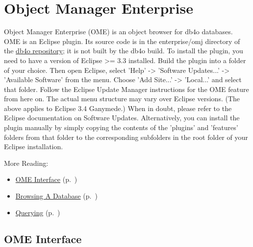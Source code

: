 
\chapter{Object Manager Enterprise}
\label{ref:object-manager-enterprise}

Object Manager Enterprise (OME) is an object browser for db4o databases. OME is an Eclipse plugin. Its source code is in the enterprise/omj directory of the \href{https://github.com/blakemcbride/db4o}{db4o repository}; it is not built by the db4o build. To install the plugin, you need to have a version of Eclipse \textgreater{}= 3.3 installed. Build the plugin into a folder of your choice. Then open Eclipse, select 'Help' -\textgreater{} 'Software Updates...' -\textgreater{} 'Available Software' from the menu. Choose 'Add Site...' -\textgreater{} 'Local...' and select that folder. Follow the Eclipse Update Manager instructions for the OME feature from here on. The actual menu structure may vary over Eclipse versions. (The above applies to Eclipse 3.4 Ganymede.) When in doubt, please refer to the Eclipse documentation on Software Updates. Alternatively, you can install the plugin manually by simply copying the contents of the 'plugins' and 'features' folders from that folder to the corresponding subfolders in the root folder of your Eclipse installation.

More Reading:

\begin{itemize}
\item \hyperref[ref:object-manager-enterprise-ome-for-eclipse-ome-interface]{OME Interface} (p.~\pageref{ref:object-manager-enterprise-ome-for-eclipse-ome-interface})
\item \hyperref[ref:object-manager-enterprise-ome-for-eclipse-browsing-a-database]{Browsing A Database} (p.~\pageref{ref:object-manager-enterprise-ome-for-eclipse-browsing-a-database})
\item \hyperref[ref:object-manager-enterprise-ome-for-eclipse-querying]{Querying} (p.~\pageref{ref:object-manager-enterprise-ome-for-eclipse-querying})
\end{itemize}

\section{OME Interface}
\label{ref:object-manager-enterprise-ome-for-eclipse-ome-interface}

